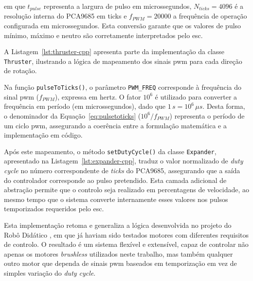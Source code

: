 em que \(t_{pulse}\) representa a largura de pulso em microssegundos, \(N_{ticks} = 4096\) é a resolução interna do PCA9685 em ticks e \(f_{PWM} = 20000\) a frequência de operação configurada em microssegundos. Esta conversão garante que os valores de pulso mínimo, máximo e neutro são corretamente interpretados pelo \gls{esc}.  

A Listagem~\ref{lst:thruster-cpp} apresenta parte da implementação da classe \texttt{Thruster}, ilustrando a lógica de mapeamento dos sinais \gls{pwm} para cada direção de rotação.  



Na função \texttt{pulseToTicks()}, o parâmetro \texttt{PWM\_FREQ} corresponde à frequência do sinal \gls{pwm} (\(f_{PWM}\)), expressa em hertz.  O fator \(10^6\) é utilizado para converter a frequência em período (em microssegundos), dado que \(1 \, s = 10^6 \, \mu s\). Desta forma, o denominador da Equação~\ref{eq:pulsetoticks} (\(10^6/f_{PWM}\)) representa o período de um ciclo \gls{pwm}, assegurando a coerência entre a formulação matemática e a implementação em código.

Após este mapeamento, o método \texttt{setDutyCycle()} da classe \texttt{Expander}, apresentado na Listagem~\ref{lst:expander-cpp}, traduz o valor normalizado de \emph{duty cycle} no número correspondente de \emph{ticks} do PCA9685, assegurando que a saída do controlador corresponde ao pulso pretendido. Esta camada adicional de abstração permite que o controlo seja realizado em percentagens de velocidade, ao mesmo tempo que o sistema converte internamente esses valores nos pulsos temporizados requeridos pelo \gls{esc}.  



Esta implementação retoma e generaliza a lógica desenvolvida no projeto do Robô Didático \cite{didactic-robot-thesis}, em que já haviam sido testados motores com diferentes requisitos de controlo. O resultado é um sistema flexível e extensível, capaz de controlar não apenas os motores \emph{brushless} utilizados neste trabalho, mas também qualquer outro motor que dependa de sinais \gls{pwm} baseados em temporização em vez de simples variação do \emph{duty cycle}.

